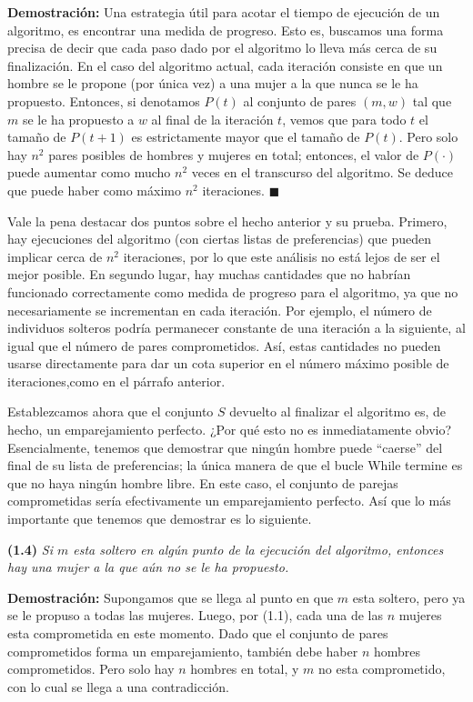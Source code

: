 \documentclass[a4paper, 12pt]{book}
\begin{document}
\textbf{Demostración:} Una estrategia útil para acotar el tiempo de ejecución de un algoritmo, es encontrar una medida de progreso. Esto es, buscamos una forma precisa de decir que cada paso dado por el algoritmo lo lleva más cerca de su finalización. En el caso del algoritmo actual, cada iteración consiste en que un hombre se le propone (por única vez) a una mujer a la que nunca se le ha propuesto. Entonces, si denotamos $P(t)$ al conjunto de pares $(m, w)$ tal que $m$ se le ha propuesto a $w$ al final de la iteración $t$, vemos que para todo $t$ el tamaño de $P(t+1)$ es estrictamente mayor que el tamaño de $P(t)$. Pero solo hay $n^2$ pares posibles de hombres y mujeres en total; entonces, el valor de $P(\cdot)$ puede aumentar como mucho $n^2$ veces en el transcurso del algoritmo. Se deduce que puede haber como máximo $n^2$ iteraciones. $\blacksquare$ 

Vale la pena destacar dos puntos sobre el hecho anterior y su prueba. Primero, hay ejecuciones del algoritmo (con ciertas listas de preferencias) que pueden implicar cerca de $n^2$ iteraciones, por lo que este análisis no está lejos de ser el mejor posible.
En segundo lugar, hay muchas cantidades que no habrían funcionado correctamente como medida de progreso para el algoritmo, ya que no necesariamente se incrementan en cada iteración. Por ejemplo, el número de individuos solteros podría permanecer constante de una iteración a la siguiente, al igual que el número de pares comprometidos. Así, estas cantidades no pueden usarse directamente para dar un cota superior en el número máximo posible de iteraciones,como en el párrafo anterior.

Establezcamos ahora que el conjunto $S$ devuelto al finalizar el
algoritmo es, de hecho, un emparejamiento perfecto. ¿Por qué esto no es inmediatamente obvio?
Esencialmente, tenemos que demostrar que ningún hombre puede ``caerse'' del final de su lista de preferencias; la única manera de que el bucle While termine es que no haya ningún hombre libre.
En este caso, el conjunto de parejas comprometidas sería efectivamente un emparejamiento perfecto.
Así que lo más importante que tenemos que demostrar es lo siguiente.

\vspace{0.2cm}\noindent
\textbf{(1.4)} \textit{Si $m$ esta soltero en algún punto de la ejecución del algoritmo, entonces hay una mujer a la que aún no se le ha propuesto.}
\vspace{0.2cm}

\textbf{Demostración:} Supongamos que se llega al punto en que $m$ esta soltero, pero ya se le propuso a todas las mujeres. Luego, por (1.1), cada una de las $n$ mujeres esta comprometida en este momento. Dado que el conjunto de pares comprometidos forma un emparejamiento, también debe haber $n$ hombres comprometidos. Pero solo hay $n$ hombres en total, y $m$ no esta comprometido, con lo cual se llega a una contradicción. 
\end{document}

